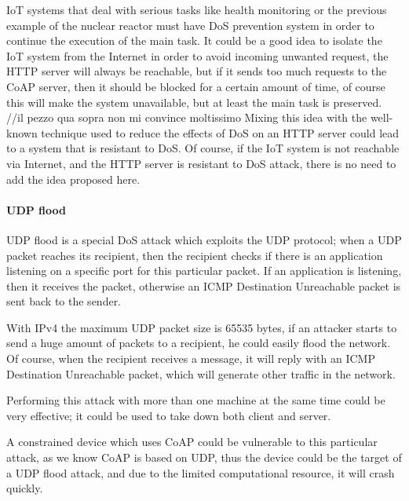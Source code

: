	IoT systems that deal with serious tasks like health monitoring or the previous example of the nuclear reactor must have DoS prevention system in order to continue the execution of the main task.\newline
	It could be a good idea to isolate the IoT system from the Internet in order to avoid incoming unwanted request, the HTTP server will always be reachable, but if it sends too much requests to the CoAP server, then it should be blocked for a certain amount of time, of course this will make the system unavailable, but at least the main task is preserved.\newline
	//il pezzo qua sopra non mi convince moltissimo
	Mixing this idea with the well-known technique used to reduce the effects of DoS on an HTTP server could lead to a system that is resistant to DoS.\newline
	Of course, if the IoT system is not reachable via Internet, and the HTTP server is resistant to DoS attack, there is no need to add the idea proposed here.\newline
	
	\paragraph{UDP flood}
	UDP flood is a special DoS attack which exploits the UDP protocol; when a UDP packet reaches its recipient, then the recipient checks if there is an application listening on a specific port for this particular packet.\newline
	If an application is listening, then it receives the packet, otherwise an ICMP Destination Unreachable packet is sent back to the sender.\newline
	
	With IPv4 the maximum UDP packet size is 65535 bytes, if an attacker starts to send a huge amount of packets to a recipient, he could easily flood the network.\newline
	Of course, when the recipient receives a message, it will reply with an ICMP Destination Unreachable packet, which will generate other traffic in the network.\newline
	
	Performing this attack with more than one machine at the same time could be very effective; it could be used to take down both client and server.\newline
	
	A constrained device which uses CoAP could be vulnerable to this particular attack, as we know CoAP is based on UDP, thus the device could be the target of a UDP flood attack, and due to the limited computational resource, it will crash quickly.\newline
	
